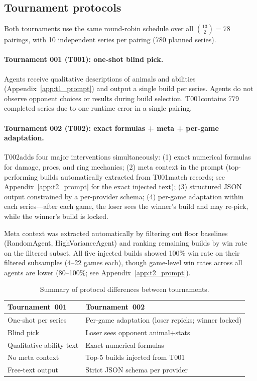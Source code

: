\documentclass[11pt]{article}
\newcommand{\tOne}{T001}
\newcommand{\tTwo}{T002}
\begin{document}
\subsection{Tournament protocols}

Both tournaments use the same round-robin schedule over all $\binom{13}{2}=78$ pairings, with 10 independent series per pairing (780 planned series).

\paragraph{Tournament 001 (\tOne): one-shot blind pick.}
Agents receive qualitative descriptions of animals and abilities (Appendix~\ref{app:t1_prompt}) and output a single build per series.
Agents do not observe opponent choices or results during build selection.
\tOne contains 779 completed series due to one runtime error in a single pairing.

\paragraph{Tournament 002 (\tTwo): exact formulas + meta + per-game adaptation.}
\tTwo adds four major interventions simultaneously:
(1) exact numerical formulas for damage, procs, and ring mechanics;
(2) meta context in the prompt (top-performing builds automatically extracted from \tOne match records; see Appendix~\ref{app:t2_prompt} for the exact injected text);
(3) structured JSON output constrained by a per-provider schema;
(4) per-game adaptation within each series---after each game, the loser sees the winner's build and may re-pick, while the winner's build is locked.

Meta context was extracted automatically by filtering out floor baselines (RandomAgent, HighVarianceAgent) and ranking remaining builds by win rate on the filtered subset.
All five injected builds showed 100\% win rate on their filtered subsamples (4--22 games each), though game-level win rates across all agents are lower (80--100\%; see Appendix~\ref{app:t2_prompt}).

\begin{table}[h]
\centering
\small
\caption{Summary of protocol differences between tournaments.}
\label{tab:protocol}
\begin{tabular}{p{} p{}}
\toprule
Tournament~001 & Tournament~002 \\
\midrule
One-shot per series & Per-game adaptation (loser repicks; winner locked) \\
Blind pick & Loser sees opponent animal+stats \\
Qualitative ability text & Exact numerical formulas \\
No meta context & Top-5 builds injected from \tOne \\
Free-text output & Strict JSON schema per provider \\
\bottomrule
\end{tabular}
\end{table}
\end{document}
